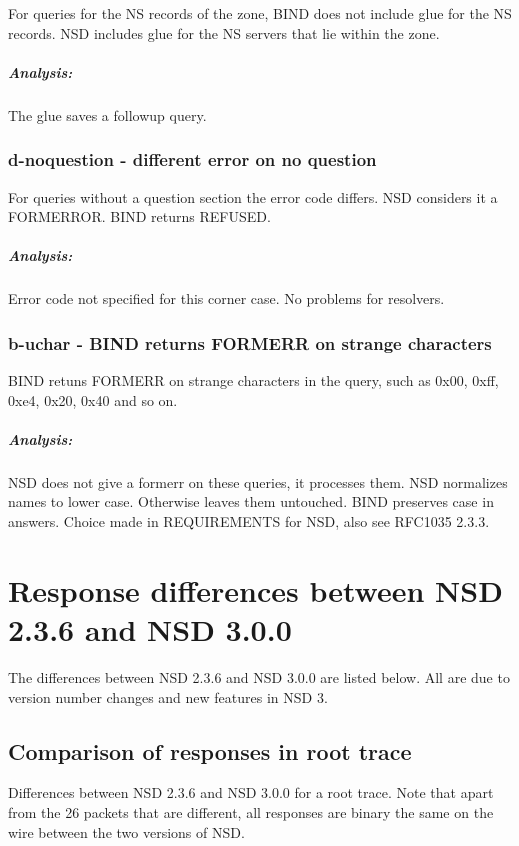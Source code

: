 \documentclass[twoside,titlepage,english]{nlnetlabs}
\begin{document}
For queries for the NS records of the zone, BIND does not include glue
for the NS records. NSD includes glue for the NS servers that lie within
the zone.

\vspace{-8pt}\subparagraph{Analysis:}

The glue saves a followup query.


\subsubsection{d-noquestion - different error on no question}
\label{d-noquestion}

For queries without a question section the error code differs.
NSD considers it a FORMERROR. BIND returns REFUSED.

\vspace{-8pt}\subparagraph{Analysis:}

Error code not specified for this corner case. No problems for resolvers.


\subsubsection{b-uchar - BIND returns FORMERR on strange characters}
\label{b-uchar}

BIND retuns FORMERR on strange characters in the query, such as
0x00, 0xff, 0xe4, 0x20, 0x40 and so on.

\vspace{-8pt}\subparagraph{Analysis:}

NSD does not give a formerr on these queries, it processes them.
NSD normalizes names to lower case. Otherwise leaves them untouched.
BIND preserves case in answers. Choice made in REQUIREMENTS for NSD,
also see RFC1035\cite{rfc1035} 2.3.3.


\section{Response differences between NSD 2.3.6 and NSD 3.0.0}

The differences between NSD 2.3.6 and NSD 3.0.0 are listed below. All are due
to version number changes and new features in NSD 3.


\subsection{Comparison of responses in root trace}

Differences between NSD 2.3.6 and NSD 3.0.0 for a root trace.
Note that apart from the 26 packets that are different, all responses are
binary the same on the wire between the two versions of NSD.
\end{document}
